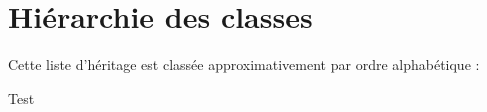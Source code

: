 \section{Hiérarchie des classes}
Cette liste d'héritage est classée approximativement par ordre alphabétique \+:\begin{DoxyCompactList}
\item Test\begin{DoxyCompactList}
\item {}
\end{DoxyCompactList}
\item {}
\end{DoxyCompactList}
